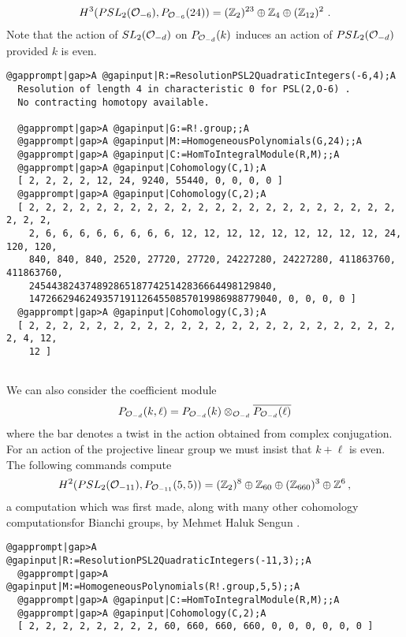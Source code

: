 \documentclass[a4paper,11pt]{report}
\begin{document}
{{\[H^3(PSL_2({\cal O}_{-6}),P_{{\cal O}_{-6}}(24)) = (\mathbb Z_2)^{23} \oplus
\mathbb Z_{4} \oplus (\mathbb Z_{12})^2\ . \]
 Note that the action of $SL_2({\cal O}_{-d})$ on $P_{{\cal O}_{-d}}(k)$ induces an action of $PSL_2({\cal O}_{-d})$ provided $k$ is even. 
\begin{Verbatim}[commandchars=@|A,fontsize=\small,frame=single,label=Example]
  @gapprompt|gap>A @gapinput|R:=ResolutionPSL2QuadraticIntegers(-6,4);A
  Resolution of length 4 in characteristic 0 for PSL(2,O-6) . 
  No contracting homotopy available. 
  
  @gapprompt|gap>A @gapinput|G:=R!.group;;A
  @gapprompt|gap>A @gapinput|M:=HomogeneousPolynomials(G,24);;A
  @gapprompt|gap>A @gapinput|C:=HomToIntegralModule(R,M);;A
  @gapprompt|gap>A @gapinput|Cohomology(C,1);A
  [ 2, 2, 2, 2, 12, 24, 9240, 55440, 0, 0, 0, 0 ]
  @gapprompt|gap>A @gapinput|Cohomology(C,2);A
  [ 2, 2, 2, 2, 2, 2, 2, 2, 2, 2, 2, 2, 2, 2, 2, 2, 2, 2, 2, 2, 2, 2, 2, 2, 2, 
    2, 6, 6, 6, 6, 6, 6, 6, 6, 12, 12, 12, 12, 12, 12, 12, 12, 12, 24, 120, 120, 
    840, 840, 840, 2520, 27720, 27720, 24227280, 24227280, 411863760, 411863760, 
    2454438243748928651877425142836664498129840, 
    14726629462493571911264550857019986988779040, 0, 0, 0, 0 ]
  @gapprompt|gap>A @gapinput|Cohomology(C,3);A
  [ 2, 2, 2, 2, 2, 2, 2, 2, 2, 2, 2, 2, 2, 2, 2, 2, 2, 2, 2, 2, 2, 2, 2, 4, 12, 
    12 ]
  
\end{Verbatim}
 

We can also consider the coefficient module 
\[ P_{{\cal O}_{-d}}(k,\ell) = P_{{\cal O}_{-d}}(k) \otimes_{{\cal O}_{-d}}
\overline{P_{{\cal O}_{-d}}(\ell)} \]
 where the bar denotes a twist in the action obtained from complex conjugation.
For an action of the projective linear group we must insist that $k+\ell$ is even. The following commands compute 
\[H^2(PSL_2({\cal O}_{-11}),P_{{\cal O}_{-11}}(5,5)) = (\mathbb Z_2)^8 \oplus
\mathbb Z_{60} \oplus (\mathbb Z_{660})^3 \oplus \mathbb Z^6\,, \]
 a computation which was first made, along with many other cohomology
computationsfor Bianchi groups, by Mehmet Haluk Sengun \cite{sengun}. 
\begin{Verbatim}[commandchars=@|A,fontsize=\small,frame=single,label=Example]
  @gapprompt|gap>A @gapinput|R:=ResolutionPSL2QuadraticIntegers(-11,3);;A
  @gapprompt|gap>A @gapinput|M:=HomogeneousPolynomials(R!.group,5,5);;A
  @gapprompt|gap>A @gapinput|C:=HomToIntegralModule(R,M);;A
  @gapprompt|gap>A @gapinput|Cohomology(C,2);A
  [ 2, 2, 2, 2, 2, 2, 2, 2, 60, 660, 660, 660, 0, 0, 0, 0, 0, 0 ]
  

\end{Verbatim}}}
\end{document}
